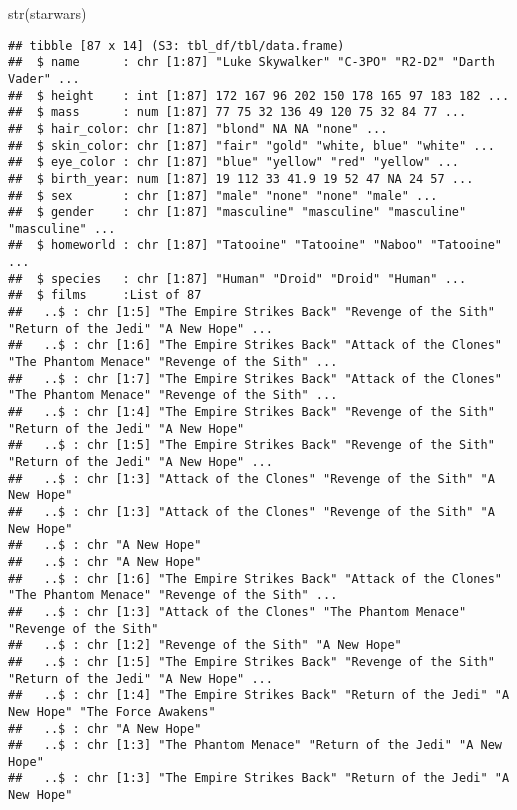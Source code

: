 \documentclass[
]{article}
\newenvironment{Shaded}{\begin{snugshade}}{\end{snugshade}}
\newcommand{\FunctionTok}[1]{\textcolor[rgb]{0.00,0.00,0.00}{#1}}
\newcommand{\NormalTok}[1]{#1}
\begin{document}
\begin{Shaded}
\begin{Highlighting}[]
\FunctionTok{str}\NormalTok{(starwars)}
\end{Highlighting}
\end{Shaded}

\begin{verbatim}
## tibble [87 x 14] (S3: tbl_df/tbl/data.frame)
##  $ name      : chr [1:87] "Luke Skywalker" "C-3PO" "R2-D2" "Darth Vader" ...
##  $ height    : int [1:87] 172 167 96 202 150 178 165 97 183 182 ...
##  $ mass      : num [1:87] 77 75 32 136 49 120 75 32 84 77 ...
##  $ hair_color: chr [1:87] "blond" NA NA "none" ...
##  $ skin_color: chr [1:87] "fair" "gold" "white, blue" "white" ...
##  $ eye_color : chr [1:87] "blue" "yellow" "red" "yellow" ...
##  $ birth_year: num [1:87] 19 112 33 41.9 19 52 47 NA 24 57 ...
##  $ sex       : chr [1:87] "male" "none" "none" "male" ...
##  $ gender    : chr [1:87] "masculine" "masculine" "masculine" "masculine" ...
##  $ homeworld : chr [1:87] "Tatooine" "Tatooine" "Naboo" "Tatooine" ...
##  $ species   : chr [1:87] "Human" "Droid" "Droid" "Human" ...
##  $ films     :List of 87
##   ..$ : chr [1:5] "The Empire Strikes Back" "Revenge of the Sith" "Return of the Jedi" "A New Hope" ...
##   ..$ : chr [1:6] "The Empire Strikes Back" "Attack of the Clones" "The Phantom Menace" "Revenge of the Sith" ...
##   ..$ : chr [1:7] "The Empire Strikes Back" "Attack of the Clones" "The Phantom Menace" "Revenge of the Sith" ...
##   ..$ : chr [1:4] "The Empire Strikes Back" "Revenge of the Sith" "Return of the Jedi" "A New Hope"
##   ..$ : chr [1:5] "The Empire Strikes Back" "Revenge of the Sith" "Return of the Jedi" "A New Hope" ...
##   ..$ : chr [1:3] "Attack of the Clones" "Revenge of the Sith" "A New Hope"
##   ..$ : chr [1:3] "Attack of the Clones" "Revenge of the Sith" "A New Hope"
##   ..$ : chr "A New Hope"
##   ..$ : chr "A New Hope"
##   ..$ : chr [1:6] "The Empire Strikes Back" "Attack of the Clones" "The Phantom Menace" "Revenge of the Sith" ...
##   ..$ : chr [1:3] "Attack of the Clones" "The Phantom Menace" "Revenge of the Sith"
##   ..$ : chr [1:2] "Revenge of the Sith" "A New Hope"
##   ..$ : chr [1:5] "The Empire Strikes Back" "Revenge of the Sith" "Return of the Jedi" "A New Hope" ...
##   ..$ : chr [1:4] "The Empire Strikes Back" "Return of the Jedi" "A New Hope" "The Force Awakens"
##   ..$ : chr "A New Hope"
##   ..$ : chr [1:3] "The Phantom Menace" "Return of the Jedi" "A New Hope"
##   ..$ : chr [1:3] "The Empire Strikes Back" "Return of the Jedi" "A New Hope"

\end{verbatim}
\end{document}
